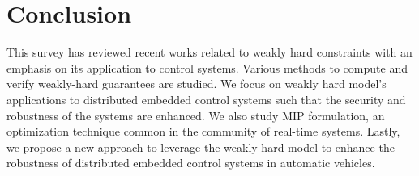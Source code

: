 \section{Conclusion} \label{conclusion}
This survey has reviewed recent works related to weakly hard constraints with an emphasis on its application to control systems. Various methods to compute and verify weakly-hard guarantees are studied. We focus on weakly hard model's applications to distributed embedded control systems such that the security and robustness of the systems are enhanced. We also study MIP formulation, an optimization technique common in the community of real-time systems. Lastly, we propose a new approach to leverage the weakly hard model to enhance the robustness of distributed embedded control systems in automatic vehicles.